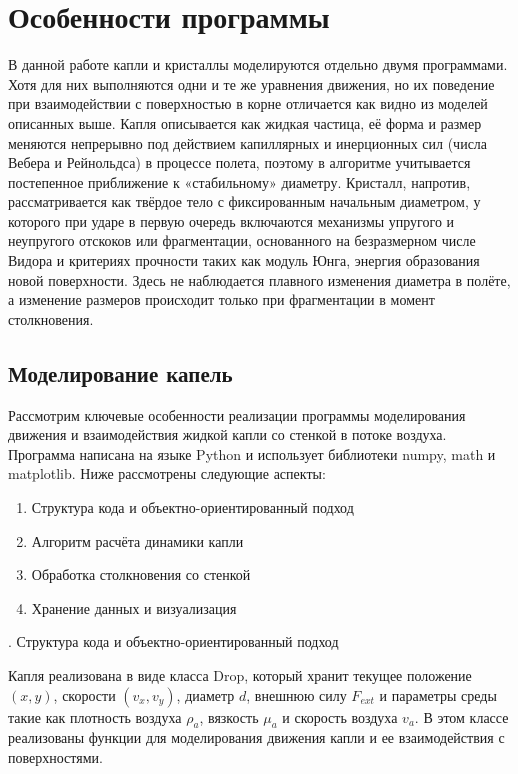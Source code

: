 \chapter{Особенности программы}

В данной работе капли и кристаллы моделируются отдельно двумя программами. Хотя для них выполняются одни и те же уравнения движения, но их поведение при взаимодействии с поверхностью в корне отличается как видно из моделей описанных выше. Капля описывается как жидкая частица, её форма и размер меняются непрерывно под действием капиллярных и инерционных сил (числа Вебера и Рейнольдса) в процессе полета, поэтому в алгоритме учитывается постепенное приближение к «стабильному» диаметру.
Кристалл, напротив, рассматривается как твёрдое тело с фиксированным начальным диаметром, у которого при ударе в первую очередь включаются механизмы упругого и неупругого отскоков или фрагментации, основанного на безразмерном числе Видора и критериях прочности таких как модуль Юнга, энергия образования новой поверхности. Здесь не наблюдается плавного изменения диаметра в полёте, а изменение размеров происходит только при фрагментации в момент столкновения.

\section{Моделирование капель}

Рассмотрим ключевые особенности реализации программы моделирования движения и взаимодействия жидкой капли со стенкой в потоке воздуха. Программа написана на языке Python и использует библиотеки numpy, math и matplotlib. Ниже рассмотрены следующие аспекты:

\begin{enumerate}
	\item Структура кода и объектно-ориентированный подход
	\item Алгоритм расчёта динамики капли
	\item Обработка столкновения со стенкой
	\item Хранение данных и визуализация
\end{enumerate}

. Структура кода и объектно-ориентированный подход

Капля реализована в виде класса Drop, который хранит текущее положение $(x,y)$, скорости $(v_x,v_y)$, диаметр $d$, внешнюю силу $F_{ext}$ и параметры среды такие как плотность воздуха $\rho_a$, вязкость $\mu_a$ и скорость воздуха $v_a$. В этом классе реализованы функции для моделирования движения капли и ее взаимодействия с поверхностями.

